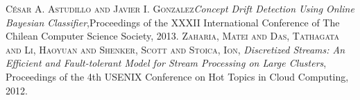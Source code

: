 \renewcommand{\baselinestretch}{1.05}\small\normalsize
\begin{thebibliography}{9} 
 \textsc{C\'esar A. Astudillo and Javier I. Gonzalez}\textit{Concept Drift Detection Using Online Bayesian Classifier},Proceedings of the XXXII International Conference of The Chilean Computer Science Society, 2013.
 \textsc{Zaharia, Matei and Das, Tathagata and Li, Haoyuan and Shenker, Scott and Stoica, Ion}, \textit{Discretized Streams: An Efficient and Fault-tolerant Model for Stream Processing on Large Clusters}, Proceedings of the 4th USENIX Conference on Hot Topics in Cloud Computing, 2012.
\end{thebibliography}


